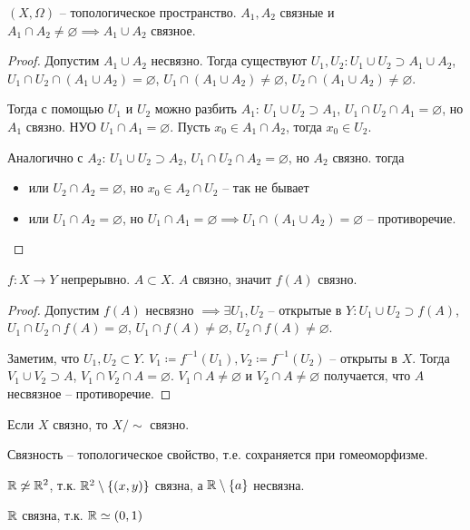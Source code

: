 \documentclass[main]{subfiles}
\begin{document}
\begin{theorem}\label{con:3}
    $(X, \Omega)$ -- топологическое пространство.
    $A_1, A_2$ связные и $A_1 \cap A_2 \neq \varnothing \implies A_1 \cup A_2$ связное.
\end{theorem}
\begin{proof}
    Допустим $A_1 \cup A_2$ несвязно.
    Тогда существуют $U_1, U_2 : U_1 \cup U_2 \supset A_1 \cup A_2$,
    $U_1 \cap U_2 \cap (A_1 \cup A_2) = \varnothing$, $U_1 \cap (A_1 \cup A_2) \neq \varnothing$, $U_2 \cap (A_1 \cup A_2) \neq \varnothing$.

    Тогда с помощью $U_1$ и $U_2$ можно разбить $A_1$:
    $U_1 \cup U_2 \supset A_1 $,
    $U_1 \cap U_2 \cap A_1  = \varnothing$, но $A_1$ связно.
    НУО $U_1 \cap A_1 = \varnothing$.
    Пусть $x_0 \in A_1 \cap A_2$, тогда $x_0 \in U_2$.

    Аналогично с $A_2$:
    $U_1 \cup U_2 \supset A_2 $,
    $U_1 \cap U_2 \cap A_2  = \varnothing$, но $A_2$ связно.
    тогда
    \begin{itemize}
        \item или $U_2 \cap A_2 = \varnothing$, но $x_0 \in A_2 \cap U_2$ -- так не бывает
        \item или $U_1 \cap A_2 = \varnothing$, но $U_1 \cap A_1 = \varnothing \implies U_1 \cap (A_1 \cup A_2) = \varnothing$ -- противоречие.
    \end{itemize}
\end{proof}

\begin{theorem}\label{con:4}
    $f: X \to Y$ непрерывно. $A \subset X$. $A$ связно, значит $f(A)$ связно.
\end{theorem}
\begin{proof}
    Допустим $f(A)$ несвязно $\implies \exists U_1, U_2$ -- открытые в $Y: U_1 \cup U_2 \supset f(A)$,
    $U_1 \cap U_2 \cap f(A) = \varnothing$, $U_1 \cap f(A) \neq \varnothing$, $U_2 \cap f(A) \neq \varnothing$.

    Заметим, что $U_1, U_2 \subset Y$.
    $V_1 \coloneqq f^{-1}(U_1), V_2 \coloneqq f^{-1}(U_2)$ -- открыты в $X$.
    Тогда $V_1 \cup V_2 \supset A$, $V_1 \cap V_2 \cap A = \varnothing$.
    $V_1 \cap A \neq \varnothing$ и $V_2 \cap A \neq \varnothing$ получается, что $A$ несвязное -- противоречие.
\end{proof}
\begin{corollary}
    Если $X$ связно, то $X/{\sim}$ связно.
\end{corollary}
\begin{corollary}
    Связность -- топологическое свойство, т.е. сохраняется при гомеоморфизме.
\end{corollary}
\begin{corollary}
    $\mathbb{R} \not\simeq \mathbb{R}^2$, т.к. $\mathbb{R}^2\setminus \{(x,y)\}$ связна, а $\mathbb{R} \setminus \{a\}$ несвязна.
\end{corollary}
\begin{corollary}
    $\mathbb{R}$ связна, т.к. $\mathbb{R} \simeq (0,1)$
\end{corollary}
\end{document}
